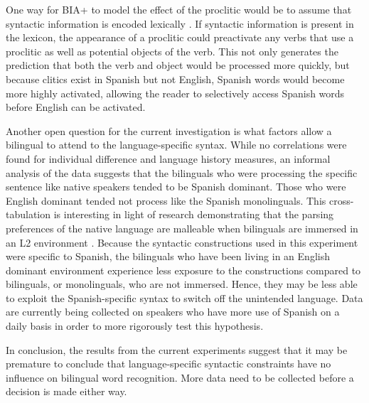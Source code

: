 One way for  BIA+ to model the effect of the proclitic would be to assume that syntactic information is encoded lexically \parencite[e.g.,][]{Pickering1998}. If syntactic information is present in the lexicon, the appearance of a proclitic could preactivate any verbs that use a proclitic as well as potential objects of the verb. This not only generates the prediction that both the verb and object would be processed more quickly, but because clitics exist in Spanish but not English, Spanish words would become more highly activated, allowing the reader to selectively access Spanish words before English can be activated. 

Another open question for the current investigation is what factors allow a bilingual to attend to the language-specific syntax. While no correlations were found for individual difference and language history  measures, an informal analysis of the data suggests that the bilinguals who were processing the specific sentence like native speakers tended to be Spanish dominant. Those who were English dominant tended not process like the Spanish monolinguals. This cross-tabulation is interesting in  light of research demonstrating that the parsing preferences of the native language are malleable  when bilinguals are immersed in an L2 environment \parencite[][]{Dussias2003,Dussias2007}. Because the syntactic constructions used in this experiment were specific to Spanish, the bilinguals who have been living in an English dominant environment experience less exposure to the constructions compared to bilinguals, or monolinguals, who are not immersed. Hence, they may be less able to exploit the Spanish-specific syntax to switch off the unintended language. Data are currently being collected on speakers who have more use of Spanish on a daily basis in order to more rigorously test this hypothesis. 

In conclusion, the results from the current experiments suggest that it may be premature to conclude that language-specific syntactic constraints have no influence on bilingual word recognition. More data need to be collected before a decision is made either way. 
